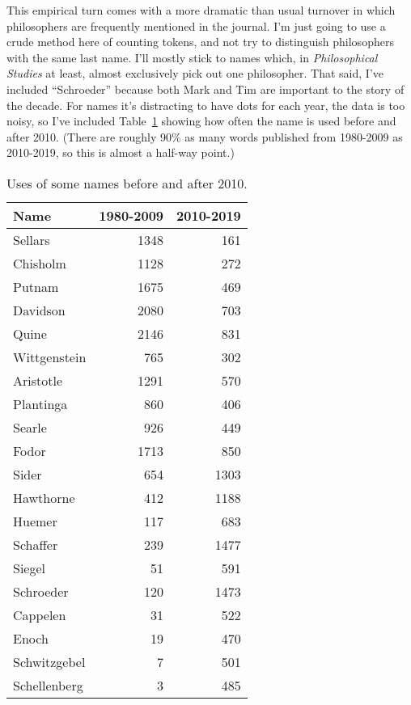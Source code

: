 \documentclass[
  11pt,
  letterpaper,
  DIV=11,
  numbers=noendperiod,
  twoside]{scrartcl}
\begin{document}
This empirical turn comes with a more dramatic than usual turnover in
which philosophers are frequently mentioned in the journal. I'm just
going to use a crude method here of counting tokens, and not try to
distinguish philosophers with the same last name. I'll mostly stick to
names which, in \emph{Philosophical Studies} at least, almost
exclusively pick out one philosopher. That said, I've included
``Schroeder'' because both Mark and Tim are important to the story of
the decade. For names it's distracting to have dots for each year, the
data is too noisy, so I've included Table~\ref{tbl-names-early-late}
showing how often the name is used before and after 2010. (There are
roughly 90\% as many words published from 1980-2009 as 2010-2019, so
this is almost a half-way point.)

\begin{longtable}[]{@{}lrr@{}}

\caption{\label{tbl-names-early-late}Uses of some names before and after
2010.}

\tabularnewline

\toprule\noalign{}
Name & 1980-2009 & 2010-2019 \\
\midrule\noalign{}
\endhead
\bottomrule\noalign{}
\endlastfoot
Sellars & 1348 & 161 \\
Chisholm & 1128 & 272 \\
Putnam & 1675 & 469 \\
Davidson & 2080 & 703 \\
Quine & 2146 & 831 \\
Wittgenstein & 765 & 302 \\
Aristotle & 1291 & 570 \\
Plantinga & 860 & 406 \\
Searle & 926 & 449 \\
Fodor & 1713 & 850 \\
Sider & 654 & 1303 \\
Hawthorne & 412 & 1188 \\
Huemer & 117 & 683 \\
Schaffer & 239 & 1477 \\
Siegel & 51 & 591 \\
Schroeder & 120 & 1473 \\
Cappelen & 31 & 522 \\
Enoch & 19 & 470 \\
Schwitzgebel & 7 & 501 \\
Schellenberg & 3 & 485 \\

\end{longtable}
\end{document}
